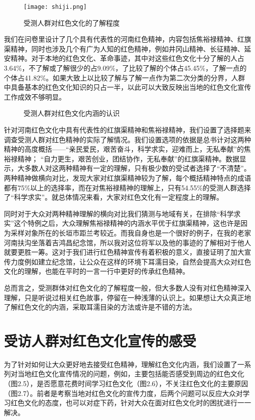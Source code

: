 \documentclass[AutoFakeBold]{LZUThesis}
\begin{document}
\begin{figure}[htbp]
    \centering
    \texttt{[image: shiji.png]}
    \caption{受测人群对红色文化的了解程度}
\end{figure}

我们在问卷里设计了几个具有代表性的河南红色精神，内容包括焦裕禄精神、红旗渠精神，同时也涉及几个有广为人知的红色精神，例如井冈山精神、长征精神、延安精神。对于本地的红色文化、革命事迹，其中对这些红色文化十分了解的人占3.64\%，不了解或了解很少的占9.09\%，了比较了解的个体占45.45\%，了解一点的个体占41.82\%。如果大致上以比较了解与了解一点作为第二次分类的分界，人群中具备基本的红色文化知识的只占一半，以此可以大致反映出当地的红色文化宣传工作成效不够明显。

\begin{figure}[htbp]
    \centering
    \quad
    \caption{受测人群对红色文化内涵的认识}
\end{figure}

针对河南红色文化中具有代表性的红旗渠精神和焦裕禄精神，我们设置了选择题来调查受测人群对红色精神的实际了解情况。我们设置选项的依据是总书计对这两种精神的高度概括——“亲民爱民，艰苦奋斗，科学求实，迎难而上，无私奉献”的焦裕禄精神； “自力更生，艰苦创业，团结协作，无私奉献”的红旗渠精神。数据显示，大多数人对这两种精神有一定的理解，只有极少数的受试者选择了“不清楚”。两种精神做横向对比，发现大家对红旗渠精神较为了解，每个概括精神特点的成语都有75\%以上的选择率，而在对焦裕禄精神的理解上，只有54.55\%的受测人群选择了“科学求实”。就总体情况来看，大家对红色文化有一定程度上的理解。

同时对于大众对两种精神理解的横向对比我们猜测与地域有关，在排除“科学求实”这个特例之后，大众理解焦裕禄精神的内涵水平优于红旗渠精神，这也许是因为采样对象所在的长垣市距兰考较近。而我自身也是一个很好的例子，在我的老家河南扶沟坐落着吉鸿昌纪念馆，所以我对这位将军以及他的事迹的了解相对于他人就要更胜一筹。这对于我们进行红色精神宣传有着积极的意义，直接证明了加大宣传力度例如建立纪念馆，让公众在这样的环境下耳濡目染，自然会提高大众对红色文化的理解，也能在平时的一言一行中更好的传承红色精神。

总而言之，受测群体对红色文化的了解程度一般，但大多数人没有对红色精神深入理解，只是听说过相关红色故事，停留在一种浅薄的认识上。如果想让大众真正地了解红色文化的内涵，采取耳濡目染的方法或许是不错的方法。

\section{受访人群对红色文化宣传的感受}
为了针对如何让大众更好地去接受红色精神，理解红色文化内涵，我们设置了一系列对当地红色文化宣传情况的问题，例如，主要包括能否感受到周边的红色文化（图2.5），是否愿意花费时间学习红色文化（图2.6），不关注红色文化的主要原因（图2.7）。前者是考察当地对红色文化的宣传力度，后两个问题可以反应大众对学习红色文化的态度，也可以对症下药，针对大众在面对红色文化时的困扰进行一一解决。
\end{document}
